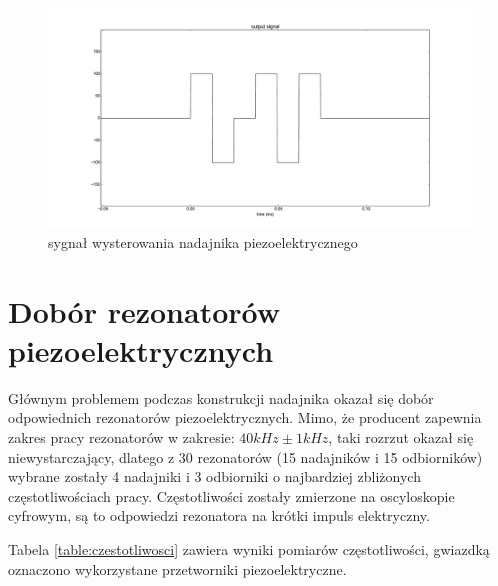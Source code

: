  \begin{figure}[h!]
    \centering
    \includegraphics[width=1.15\textwidth, trim= 47mm 0mm 0mm 0mm,clip]{output_signal}
    \caption{sygnał wysterowania nadajnika piezoelektrycznego}
    \label{fig:output_signal}
\end{figure}

\newpage

\section{Dobór rezonatorów piezoelektrycznych}

Głównym problemem podczas konstrukcji nadajnika okazał się dobór odpowiednich rezonatorów piezoelektrycznych.
Mimo, że producent zapewnia zakres pracy rezonatorów w zakresie: $40 kHz \pm 1kHz$, taki rozrzut okazał się niewystarczający, 
dlatego z 30 rezonatorów (15 nadajników i 15 odbiorników) wybrane zostały 4 nadajniki i 3 odbiorniki o najbardziej 
zbliżonych częstotliwościach pracy. Częstotliwości zostały zmierzone na oscyloskopie cyfrowym, są to odpowiedzi 
rezonatora na krótki impuls elektryczny.

Tabela \ref{table:czestotliwosci} zawiera wyniki pomiarów częstotliwości, gwiazdką oznaczono wykorzystane przetworniki piezoelektryczne.

